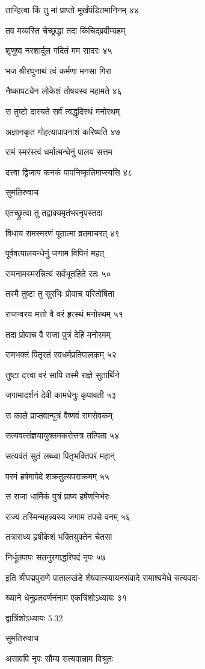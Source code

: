 तान्हित्वा किं तु मां प्राप्तो मूर्खंपंडितमानिनम् ४४

तव मय्यस्ति चेच्छ्रद्धा तदा किंचिद्ब्रवीम्यहम्

शृणुष्व नरशार्दूल गदितं मम सादरः ४५

भज श्रीरघुनाथं त्वं कर्मणा मनसा गिरा

नैष्कापट्येन लोकेशं तोषयस्व महामते ४६

स तुष्टो दास्यते सर्वं त्वद्धृदिस्थं मनोरथम्

अज्ञानकृत गोहत्यापापनाशं करिष्यति ४७

रामं स्मरंस्त्वं धर्मात्मन्धेनुं पालय सत्तम

दत्त्वा द्विजाय कनकं पापनिष्कृतिमाप्स्यसि ४८

सुमतिरुवाच

एतच्छ्रुत्वा तु तद्वाक्यमृतंभरनृपस्तदा

विधाय रामस्मरणं पूतात्मा व्रतमाचरत् ४९

पूर्ववत्पालयन्धेनुं जगाम विपिनं महत्

रामनामस्मरन्नित्यं सर्वभूतहिते रतः ५०

तस्मै तुष्टा तु सुरभिः प्रोवाच परितोषिता

राजन्वरय मत्तो वै वरं हृत्स्थं मनोरथम् ५१

तदा प्रोवाच वै राजा पुत्रं देहि मनोरमम्

रामभक्तं पितृरतं स्वधर्मप्रतिपालकम् ५२

तुष्टा दत्त्वा वरं सापि तस्मै राज्ञे सुतार्थिने

जगामादर्शनं देवी कामधेनुः कृपावती ५३

स काले प्राप्तवान्पुत्रं वैष्णवं रामसेवकम्

सत्यवत्संज्ञयायुक्तमकरोत्तत्र तत्पिता ५४

सत्यवंतं सुतं लब्ध्वा पितृभक्तिपरं महान्

परमं हर्षमापेदे शक्रतुल्यपराक्रमम् ५५

स राजा धार्मिकं पुत्रं प्राप्य हर्षेणनिर्भरः

राज्यं तस्मिन्महन्न्यस्य जगाम तपसे वनम् ५६

तत्राराध्य हृषीकेशं भक्तियुक्तेन चेतसा

निर्धूतपापः सतनुरगाद्धरिपदं नृपः ५७

इति श्रीपद्मपुराणे पातालखंडे शेषवात्स्यायनसंवादे रामाश्वमेधे सत्यवदा-

ख्याने धेनुव्रतवर्णनंनाम एकत्रिंशोऽध्यायः ३१

द्वात्रिंशोऽध्यायः 5.32

सुमतिरुवाच

असावपि नृपः सौम्य सत्यवान्नाम विश्रुतः


